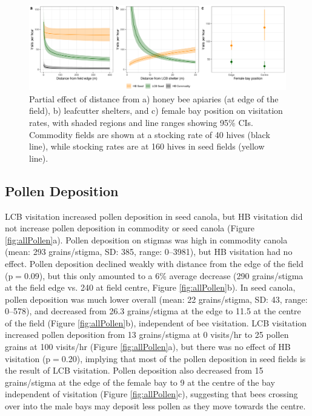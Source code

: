 \documentclass[12pt]{article} %
\begin{document}
\begin{figure}
    \centering
    \includegraphics[width=\textwidth,keepaspectratio=true]{../Figures/allVisits.png}
    \caption{Partial effect of distance from a) honey bee apiaries (at edge of the field), b) leafcutter shelters, and c) female bay position on visitation rates, with shaded regions and line ranges showing 95\% CIs. Commodity fields are shown at a stocking rate of 40 hives (black line), while stocking rates are at 160 hives in seed fields (yellow line).}
    \label{fig:allVisits}
\end{figure}

\subsection*{Pollen Deposition}

LCB visitation increased pollen deposition in seed canola, but HB visitation did not increase pollen deposition in commodity or seed canola (Figure \ref{fig:allPollen}a).
Pollen deposition on stigmas was high in commodity canola (mean: 293 grains/stigma, SD: 385, range: 0--3981), but HB visitation had no effect.
Pollen deposition declined weakly with distance from the edge of the field (p$=$0.09), but this only amounted to a 6\% average decrease (290 grains/stigma at the field edge vs. 240 at field centre, Figure \ref{fig:allPollen}b).
In seed canola, pollen deposition was much lower overall (mean: 22 grains/stigma, SD: 43, range: 0--578), and decreased from 26.3 grains/stigma at the edge to 11.5 at the centre of the field (Figure \ref{fig:allPollen}b), independent of bee visitation.
LCB visitation increased pollen deposition from 13 grains/stigma at 0 visits/hr to 25 pollen grains at 100 visits/hr (Figure \ref{fig:allPollen}a), but there was no effect of HB visitation (p$=$0.20), implying that most of the pollen deposition in seed fields is the result of LCB visitation.
Pollen deposition also decreased from 15 grains/stigma at the edge of the female bay to 9 at the centre of the bay independent of visitation (Figure \ref{fig:allPollen}c), suggesting that bees crossing over into the male bays may deposit less pollen as they move towards the centre.%
\end{document}
